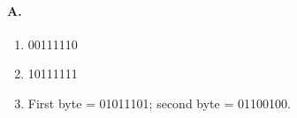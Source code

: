 \paragraph{A.}
\begin{enumerate}
	\item 00111110
	\item 10111111
	\item First byte = 01011101; second byte = 01100100.
\end{enumerate}